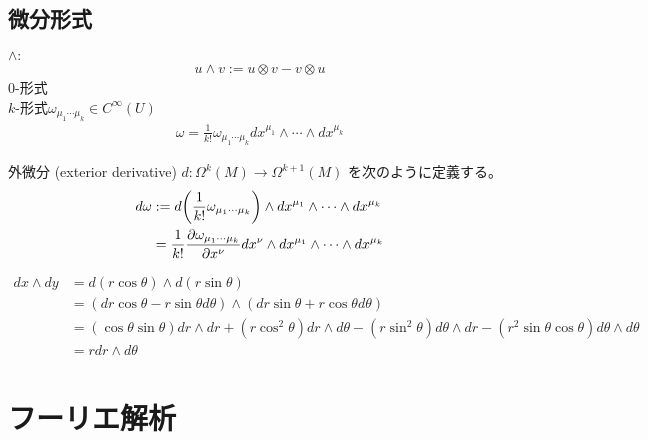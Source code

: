 \documentclass[uplatex,dvipdfmx,a4paper,11pt]{jlreq}
\theoremstyle{definition}
\begin{document}
\subsection{微分形式}
\begin{definition}[微分形式]
  $\land:$
  \begin{align}
    u\land v := u\otimes v - v\otimes u
  \end{align}
  $0$-形式 \\
  $k$-形式$\omega_{\mu_1\cdots\mu_k}\in C^\infty(U)$
  \begin{align}
    \omega = \frac{1}{k!}\omega_{\mu_1\cdots\mu_k}dx^{\mu_1}\land\cdots\land dx^{\mu_k}
  \end{align}
\end{definition}
\begin{definition}[外微分]
  外微分 (exterior derivative) $d: \Omega^k(M)\to\Omega^{k+1}(M)$ を次のように定義する。
  \begin{align}
    d\omega & := d\qty(\frac{1}{k!}\omega_{\mu_1\cdots\mu_k})\land dx^{\mu_1}\land\cdots\land dx^{\mu_k}                \\
            & = \frac{1}{k!}\pdv{\omega_{\mu_1\cdots\mu_k}}{x^{\nu}}dx^{\nu}\land dx^{\mu_1}\land\cdots\land dx^{\mu_k}
  \end{align}
\end{definition}
\begin{align}
  dx\land dy & = d(r\cos\theta)\land d(r\sin\theta)                                                                                                                  \\
             & = (dr\cos\theta - r\sin\theta d\theta)\land (dr\sin\theta + r\cos\theta d\theta)                                                                      \\
             & = (\cos\theta\sin\theta)dr\land dr + (r\cos^2\theta)dr\land d\theta - (r\sin^2\theta) d\theta\land dr - (r^2\sin\theta\cos\theta)d\theta\land d\theta \\
             & = r dr\land d\theta
\end{align}

\begin{definition}
\end{definition}

\begin{theorem}[ストークスの定理]
\end{theorem}

\section{フーリエ解析}
\end{document}
